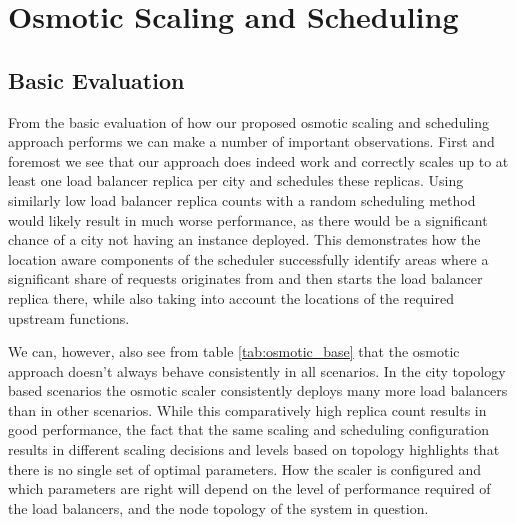 \documentclass[draft,final]{vutinfth} %
\begin{document}
\section{Osmotic Scaling and Scheduling}

\subsection{Basic Evaluation}
From the basic evaluation of how our proposed osmotic scaling and scheduling approach performs we can make a number of important observations.
First and foremost we see that our approach does indeed work and correctly scales up to at least one load balancer replica per city and schedules these replicas.
Using similarly low load balancer replica counts with a random scheduling method would likely result in much worse performance, as there would be a significant chance of a city not having an instance deployed.
This demonstrates how the location aware components of the scheduler successfully identify areas where a significant share of requests originates from and then starts the load balancer replica there, while also taking into account the locations of the required upstream functions.

We can, however, also see from table \ref{tab:osmotic_base} that the osmotic approach doesn't always behave consistently in all scenarios.
In the city topology based scenarios the osmotic scaler consistently deploys many more load balancers than in other scenarios.
While this comparatively high replica count results in good performance, the fact that the same scaling and scheduling configuration results in different scaling decisions and levels based on topology highlights that there is no single set of optimal parameters.
How the scaler is configured and which parameters are right will depend on the level of performance required of the load balancers, and the node topology of the system in question.
\end{document}
